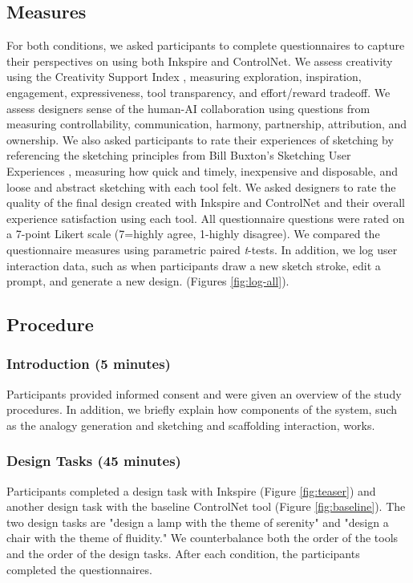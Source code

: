 \documentclass[sigconf, screen]{acmart}
\begin{document}
\subsection{Measures}

For both conditions, we asked participants to complete questionnaires to capture their perspectives on using both Inkspire and ControlNet.
We assess creativity using the Creativity Support Index \cite{cherry2014quantifying}, measuring exploration, inspiration, engagement, expressiveness, tool transparency, and effort/reward tradeoff.
We assess designers sense of the human-AI collaboration using questions from \cite{lawton2023drawing} measuring controllability, communication, harmony, partnership, attribution, and ownership. 
We also asked participants to rate their experiences of sketching by referencing the sketching principles from Bill Buxton's Sketching User Experiences \cite{buxton2010sketching}, measuring how quick and timely, inexpensive and disposable, and loose and abstract sketching with each tool felt.
We asked designers to rate the quality of the final design created with Inkspire and ControlNet and their overall experience satisfaction using each tool.
All questionnaire questions were rated on a 7-point Likert scale (7=highly agree, 1-highly disagree).
We compared the questionnaire measures using parametric paired \textit{t}-tests.
In addition, we log user interaction data, such as when participants draw a new sketch stroke, edit a prompt, and generate a new design. (Figures \ref{fig:log-all}).

\subsection{Procedure}

\subsubsection{Introduction (5 minutes)}

Participants provided informed consent and were given an overview of the study procedures. In addition, we briefly explain how components of the system, such as the analogy generation and sketching and scaffolding interaction, works.

\subsubsection{Design Tasks (45 minutes)}

Participants completed a design task with Inkspire (Figure \ref{fig:teaser}) and another design task with the baseline ControlNet tool (Figure \ref{fig:baseline}). 
The two design tasks are "design a lamp with the theme of serenity" and "design a chair with the theme of fluidity." We counterbalance both the order of the tools and the order of the design tasks. After each condition, the participants completed the questionnaires. 
\end{document}
